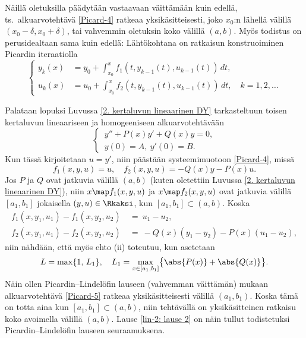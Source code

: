 Näillä oletuksilla päädytään vastaavaan väittämään kuin edellä, ts.\ alkuarvotehtävä 
\eqref{Picard-4} ratkeaa yksikäsitteisesti, joko $x_0$:n lähellä välillä 
$(x_0-\delta,x_0+\delta)$, tai vahvemmin oletuksin koko välillä $(a,b)$. Myös todistus on 
perusidealtaan sama kuin edellä: Lähtökohtana on ratkaisun konstruoiminen Picardin iteraatiolla
\[ \left\{ \begin{aligned} 
y_k(x) &= y_0+\int_{x_0}^x f_1(t,y_{k-1}(t),u_{k-1}(t))\,dt, \\
u_k(x) &= u_0+\int_{x_0}^x f_2(t,y_{k-1}(t),u_{k-1}(t))\,dt, \quad k=1,2, \ldots 
           \end{aligned} \right. \]

Palataan lopuksi Luvussa \ref{2. kertaluvun lineaarinen DY} tarkasteltuun toisen kertaluvun
lineaariseen ja homogeeniseen alkuarvotehtävään
\begin{equation} \label{Picard-5}
\begin{cases}
\,y''+P(x)y'+Q(x)y=0, \\ \,y(0)=A, \ y'(0)=B.
\end{cases}
\end{equation}
Kun tässä kirjoitetaan $u=y'$, niin päästään systeemimuotoon \eqref{Picard-4}, missä
\[
f_1(x,y,u)=u, \quad f_2(x,y,u) = -Q(x)y-P(x)u. 
\]
Jos $P$ ja $Q$ ovat jatkuvia välillä $(a,b)$ (kuten oletettiin Luvussa 
\ref{2. kertaluvun lineaarinen DY}), niin $x \map f_1(x,y,u)$ ja $x \map f_2(x,y,u)$ ovat
jatkuvia välillä $[a_1,b_1]$ jokaisella $(y,u)\in\Rkaksi$, kun $[a_1,b_1]\subset(a,b)$. Koska
\begin{align*}
f_1(x,y_1,u_1)-f_1(x,y_2,u_2)\ &=\ u_1-u_2, \\
f_2(x,y_1,u_1)-f_2(x,y_2,u_2)\ &=\ -Q(x)(y_1-y_2)-P(x)(u_1-u_2), 
\end{align*}
niin nähdään, että myös ehto (ii) toteutuu, kun asetetaan
\[ 
L=\max\{1,\,L_1\}, \quad L_1 = \max_{x\in[a_1,b_1]}\bigl\{\abs{P(x)}+\abs{Q(x)}\bigr\}. 
\]
Näin ollen Picardin--Lindelöfin lauseen (vahvemman väittämän) mukaan alkuarvotehtävä 
\eqref{Picard-5} ratkeaa yksikäsitteisesti välillä $(a_1,b_1)$. Koska tämä on totta aina kun
$[a_1,b_1] \subset (a,b)$, niin tehtävällä on yksikäsitteinen ratkaisu koko avoimella välillä
$(a,b)$. Lause \ref{lin-2: lause 2} on näin tullut todistetuksi Picardin--Lindelöfin lauseen
seuraamuksena.

